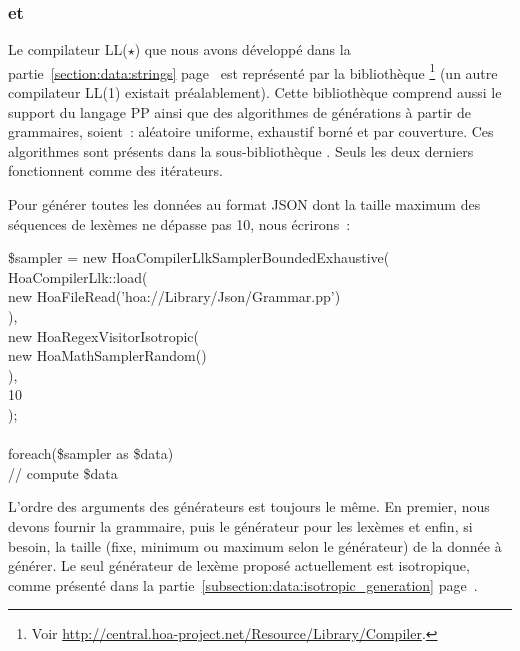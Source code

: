 \subsubsection{ et }

Le compilateur LL($\star$) que nous avons développé dans la
partie~\ref{section:data:strings} page~\pageref{section:data:strings} est
représenté par la bibliothèque
\footnote{Voir
\url{http://central.hoa-project.net/Resource/Library/Compiler}.} (un autre
compilateur LL(1) existait préalablement). Cette bibliothèque comprend aussi le
support du langage PP ainsi que des algorithmes de générations à partir de
grammaires, soient~: aléatoire uniforme, exhaustif borné et par couverture. Ces
algorithmes sont présents dans la sous-bibliothèque
.  Seuls les deux
derniers fonctionnent comme des itérateurs.

\begin{example}

Pour générer toutes les données au format JSON dont la taille maximum des
séquences de lexèmes ne dépasse pas 10, nous écrirons~:
%
\begin{pre}
\$sampler = new Hoa\bslash{}Compiler\bslash{}Llk\bslash{}Sampler\bslash{}BoundedExhaustive( \\
    Hoa\bslash{}Compiler\bslash{}Llk::load( \\
        new Hoa\bslash{}File\bslash{}Read('hoa://Library/Json/Grammar.pp') \\
    ), \\
    new Hoa\bslash{}Regex\bslash{}Visitor\bslash{}Isotropic( \\
        new Hoa\bslash{}Math\bslash{}Sampler\bslash{}Random() \\
    ), \\
    10 \\
); \\
 \\
foreach(\$sampler as \$data) \\
    // compute \$data
\end{pre}

L'ordre des arguments des générateurs est toujours le même. En premier, nous
devons fournir la grammaire, puis le générateur pour les lexèmes et enfin, si
besoin, la taille (fixe, minimum ou maximum selon le générateur) de la donnée à
générer. Le seul générateur de lexème proposé actuellement est isotropique,
comme présenté dans la partie~\ref{subsection:data:isotropic_generation}
page~\pageref{subsection:data:isotropic_generation}.

\end{example}

